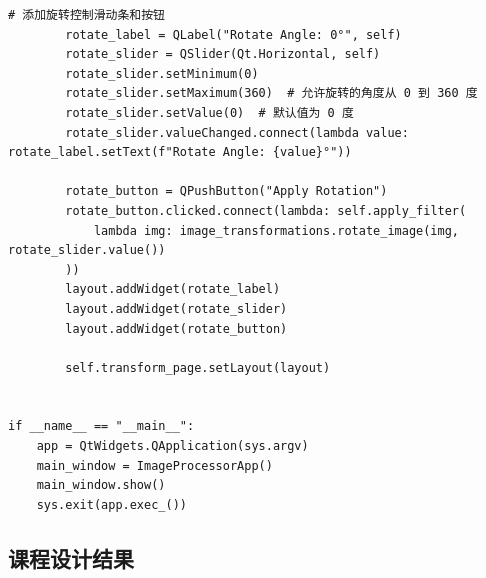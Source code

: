 \documentclass[a4paper,12pt]{article}
\begin{document}
\begin{lstlisting}[style=python]
        # 添加旋转控制滑动条和按钮
        rotate_label = QLabel("Rotate Angle: 0°", self)
        rotate_slider = QSlider(Qt.Horizontal, self)
        rotate_slider.setMinimum(0)
        rotate_slider.setMaximum(360)  # 允许旋转的角度从 0 到 360 度
        rotate_slider.setValue(0)  # 默认值为 0 度
        rotate_slider.valueChanged.connect(lambda value: rotate_label.setText(f"Rotate Angle: {value}°"))

        rotate_button = QPushButton("Apply Rotation")
        rotate_button.clicked.connect(lambda: self.apply_filter(
            lambda img: image_transformations.rotate_image(img, rotate_slider.value())
        ))
        layout.addWidget(rotate_label)
        layout.addWidget(rotate_slider)
        layout.addWidget(rotate_button)

        self.transform_page.setLayout(layout)


if __name__ == "__main__":
    app = QtWidgets.QApplication(sys.argv)
    main_window = ImageProcessorApp()
    main_window.show()
    sys.exit(app.exec_())

\end{lstlisting}

\subsection{课程设计结果}
\end{document}
